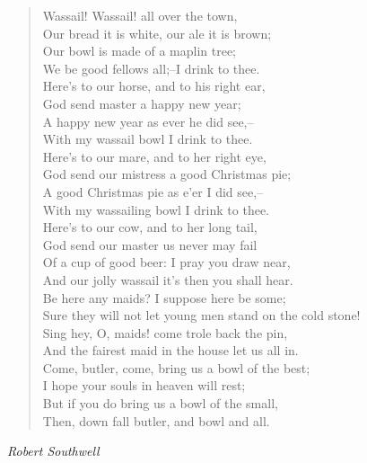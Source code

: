 
\begin{verse}
Wassail! Wassail! all over the town,\\
Our bread it is white, our ale it is brown;\\
Our bowl is made of a maplin tree;\\
We be good fellows all;--I drink to thee.\\[0.7em]

Here's to our horse, and to his right ear,\\
God send master a happy new year;\\
A happy new year as ever he did see,--\\
With my wassail bowl I drink to thee.\\[0.7em]

Here's to our mare, and to her right eye,\\
God send our mistress a good Christmas pie;\\
A good Christmas pie as e'er I did see,--\\
With my wassailing bowl I drink to thee.\\[0.7em]

Here's to our cow, and to her long tail,\\
God send our master us never may fail\\
Of a cup of good beer: I pray you draw near,\\
And our jolly wassail it's then you shall hear.\\[0.7em]

Be here any maids? I suppose here be some;\\
Sure they will not let young men stand on the cold stone!\\
Sing hey, O, maids! come trole back the pin,\\
And the fairest maid in the house let us all in.\\[0.7em]

Come, butler, come, bring us a bowl of the best;\\
I hope your souls in heaven will rest;\\
But if you do bring us a bowl of the small,\\
Then, down fall butler, and bowl and all.%
\end{verse}

\vspace{0.5\baselineskip}
\noindent\textit{Robert Southwell}

\newpage
